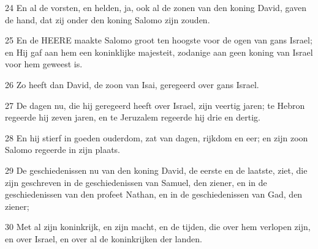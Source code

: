 \par 24 En al de vorsten, en helden, ja, ook al de zonen van den koning David, gaven de hand, dat zij onder den koning Salomo zijn zouden.
\par 25 En de HEERE maakte Salomo groot ten hoogste voor de ogen van gans Israel; en Hij gaf aan hem een koninklijke majesteit, zodanige aan geen koning van Israel voor hem geweest is.
\par 26 Zo heeft dan David, de zoon van Isai, geregeerd over gans Israel.
\par 27 De dagen nu, die hij geregeerd heeft over Israel, zijn veertig jaren; te Hebron regeerde hij zeven jaren, en te Jeruzalem regeerde hij drie en dertig.
\par 28 En hij stierf in goeden ouderdom, zat van dagen, rijkdom en eer; en zijn zoon Salomo regeerde in zijn plaats.
\par 29 De geschiedenissen nu van den koning David, de eerste en de laatste, ziet, die zijn geschreven in de geschiedenissen van Samuel, den ziener, en in de geschiedenissen van den profeet Nathan, en in de geschiedenissen van Gad, den ziener;
\par 30 Met al zijn koninkrijk, en zijn macht, en de tijden, die over hem verlopen zijn, en over Israel, en over al de koninkrijken der landen.



